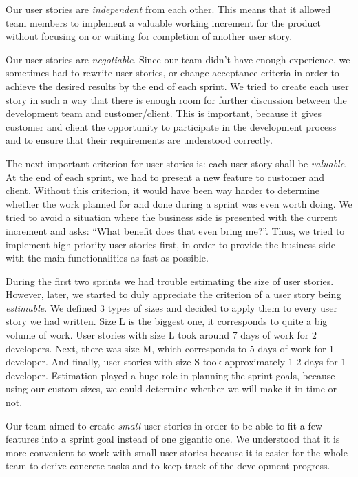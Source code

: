 Our user stories are \emph{independent} from each other. This means that it allowed team members to implement a valuable working increment for the product without focusing on or waiting for completion of another user story.

Our user stories are \emph{negotiable}. Since our team didn’t have enough experience, we sometimes had to rewrite user stories, or change acceptance criteria in order to achieve the desired results by the end of each sprint. We tried to create each user story in such a way that there is enough room for further discussion between the development team and customer/client. This is important, because it gives customer and client the opportunity to participate in the development process and to ensure that their requirements are understood correctly.

The next important criterion for user stories is: each user story shall be \emph{valuable}. At the end of each sprint, we had to present a new feature to customer and client. Without this criterion, it would have been way harder to determine whether the work planned for and done during a sprint was even worth doing. We tried to avoid a situation where the business side is presented with the current increment and asks: “What benefit does that even bring me?”. Thus, we tried to implement high-priority user stories first, in order to provide the business side with the main functionalities as fast as possible.

During the first two sprints we had trouble estimating the size of user stories. However, later, we started to duly appreciate the criterion of a user story being \emph{estimable}. We defined 3 types of sizes and decided to apply them to every user story we had written. Size L is the biggest one, it corresponds to quite a big volume of work. User stories with size L took around 7 days of work for 2 developers. Next, there was size M, which corresponds to 5 days of work for 1 developer. And finally, user stories with size S took approximately 1-2 days for 1 developer. Estimation played a huge role in planning the sprint goals, because using our custom sizes, we could determine whether we will make it in time or not.

Our team aimed to create \emph{small} user stories in order to be able to fit a few features into a sprint goal instead of one gigantic one. We understood that it is more convenient to work with small user stories because it is easier for the whole team to derive concrete tasks and to keep track of the development progress.

